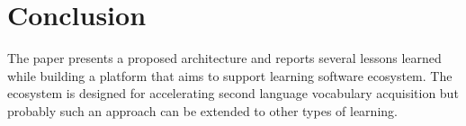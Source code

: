 
\section{Conclusion}

The paper presents a proposed architecture and reports
several lessons learned while building a platform that
aims to support learning software ecosystem. 
The ecosystem is designed for accelerating second language
vocabulary acquisition but probably such an approach can 
be extended to other types of learning. 